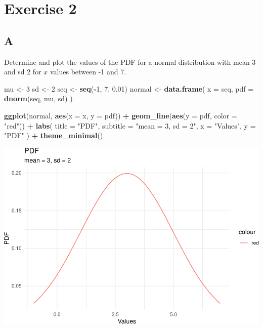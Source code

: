 \documentclass[
]{article}
\newenvironment{Shaded}{\begin{snugshade}}{\end{snugshade}}
\newcommand{\DataTypeTok}[1]{\textcolor[rgb]{0.13,0.29,0.53}{#1}}
\newcommand{\DecValTok}[1]{\textcolor[rgb]{0.00,0.00,0.81}{#1}}
\newcommand{\FloatTok}[1]{\textcolor[rgb]{0.00,0.00,0.81}{#1}}
\newcommand{\KeywordTok}[1]{\textcolor[rgb]{0.13,0.29,0.53}{\textbf{#1}}}
\newcommand{\NormalTok}[1]{#1}
\newcommand{\OperatorTok}[1]{\textcolor[rgb]{0.81,0.36,0.00}{\textbf{#1}}}
\newcommand{\StringTok}[1]{\textcolor[rgb]{0.31,0.60,0.02}{#1}}
\begin{document}
\hypertarget{exercise-2}{%
\section{Exercise 2}\label{exercise-2}}

\hypertarget{a-1}{%
\subsection{A}\label{a-1}}

Determine and plot the values of the PDF for a normal distribution with
mean 3 and sd 2 for \(x\) values between -1 and 7.

\begin{Shaded}
\begin{Highlighting}[]
\NormalTok{mu \textless{}{-}}\StringTok{ }\DecValTok{3}
\NormalTok{sd \textless{}{-}}\StringTok{ }\DecValTok{2}
\NormalTok{seq \textless{}{-}}\StringTok{ }\KeywordTok{seq}\NormalTok{(}\OperatorTok{{-}}\DecValTok{1}\NormalTok{, }\DecValTok{7}\NormalTok{, }\FloatTok{0.01}\NormalTok{)}
\NormalTok{normal \textless{}{-}}\StringTok{ }\KeywordTok{data.frame}\NormalTok{(}
  \DataTypeTok{x =}\NormalTok{ seq,}
  \DataTypeTok{pdf =} \KeywordTok{dnorm}\NormalTok{(seq, mu, sd)}
\NormalTok{)}

\KeywordTok{ggplot}\NormalTok{(normal, }\KeywordTok{aes}\NormalTok{(}\DataTypeTok{x =}\NormalTok{ x, }\DataTypeTok{y =}\NormalTok{ pdf)) }\OperatorTok{+}
\StringTok{  }\KeywordTok{geom\_line}\NormalTok{(}\KeywordTok{aes}\NormalTok{(}\DataTypeTok{y =}\NormalTok{ pdf, }\DataTypeTok{color =} \StringTok{"red"}\NormalTok{)) }\OperatorTok{+}
\StringTok{  }\KeywordTok{labs}\NormalTok{(}
    \DataTypeTok{title =} \StringTok{"PDF"}\NormalTok{,}
    \DataTypeTok{subtitle =} \StringTok{"mean = 3, sd = 2"}\NormalTok{,}
    \DataTypeTok{x =} \StringTok{"Values"}\NormalTok{,}
    \DataTypeTok{y =} \StringTok{"PDF"}
\NormalTok{  ) }\OperatorTok{+}
\StringTok{  }\KeywordTok{theme\_minimal}\NormalTok{()}
\end{Highlighting}
\end{Shaded}

\includegraphics{es_files/figure-latex/unnamed-chunk-7-1.pdf}
\end{document}
